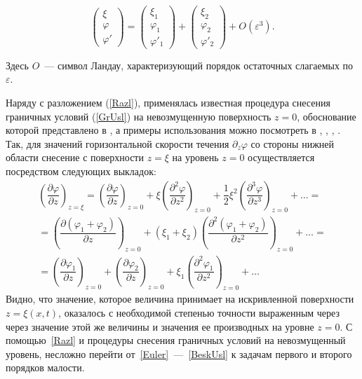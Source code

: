\begin{equation}
\begin{pmatrix}
\xi
\\
\varphi
\\
\varphi'
\end{pmatrix} = \begin{pmatrix}
\xi_{1}
\\
\varphi_{1}
\\
\varphi'_{1}
\end{pmatrix} + \begin{pmatrix}
\xi_{2}
\\
\varphi_{2}
\\
\varphi'_{2}
\end{pmatrix}+ O\left( \varepsilon^{3}\right). 
\label{Razl}
\end{equation}
 
 Здесь $ O $~--- символ Ландау, характеризующий порядок остаточных слагаемых по $ \varepsilon $.

Наряду с разложением (\ref{Razl}), применялась известная процедура снесения граничных условий (\ref{GrUsl}) на невозмущенную поверхность $ z=0 $, обоснование которой представлено в \parencite{joseph1973domain}, а примеры использования можно посмотреть в \parencite{vakbib4}, \parencite{Levich}, \parencite{mcgoldrick1972rippling}, \parencite{nayfeh1971method}. Так, для значений горизонтальной скорости течения 
$ \partial_{z} \varphi $ со стороны нижней области  снесение с поверхности $ z=\xi $ на уровень $z=0$ осуществляется посредством следующих выкладок:
\begin{eqnarray*}
\left( \dfrac{\partial \varphi}{\partial z}\right)_{z=\xi}=\left( \dfrac{\partial \varphi}{\partial z}\right)_{z=0} + \xi \left( \dfrac{\partial^{2} \varphi}{\partial z^{2}}\right)_{z=0} + \dfrac{1}{2} \xi^{2} \left( \dfrac{\partial^{3} \varphi}{\partial z^{3}}\right)_{z=0}+ \ldots = 
\\
=\left( \dfrac{\partial  \left( \varphi_{1}+\varphi_{2}\right)}{\partial z}\right)_{z=0} +  \left( \xi_{1}+\xi_{2}\right)  \left( \dfrac{\partial^{2} \left( \varphi_{1}+\varphi_{2}\right) }{\partial z^{2}}\right)_{z=0}+ \ldots = 
\\
=\left( \dfrac{\partial \varphi_{1}}{\partial z}\right)_{z=0} + \left( \dfrac{\partial \varphi_{2}}{\partial z}\right)_{z=0} + \xi_{1} \left( \dfrac{\partial^{2} \varphi_{1}}{\partial z^{2}}\right)_{z=0} + \ldots
\label{Poyasnenie}
\end{eqnarray*}
Видно, что значение, которое величина  принимает на искривленной поверхности $z=\xi(x,t)$, оказалось  с необходимой степенью точности выраженным через через значение этой же величины и значения ее производных  на уровне $z=0$. 
С помощью~\eqref{Razl} и процедуры снесения граничных условий на невозмущенный уровень, несложно перейти от~\eqref{Euler}~---~\eqref{BeskUsl} к задачам первого и второго порядков малости.  

